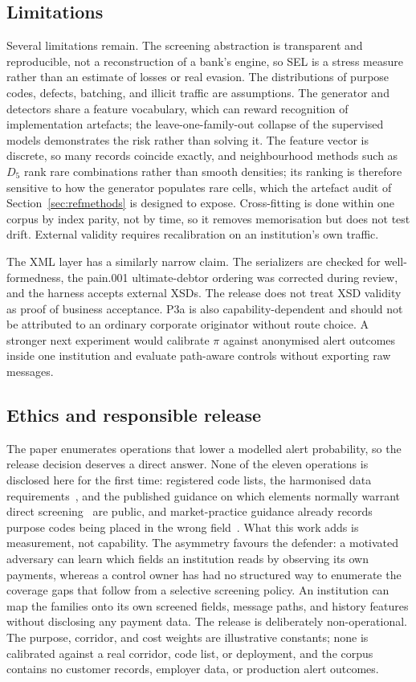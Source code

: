 \documentclass[conference]{IEEEtran}
\begin{document}
\subsection{Limitations}
Several limitations remain. The screening abstraction is transparent and
reproducible, not a reconstruction of a bank's engine, so SEL is a stress
measure rather than an estimate of losses or real evasion. The distributions
of purpose codes, defects, batching, and illicit traffic are assumptions. The
generator and detectors share a feature vocabulary, which can reward
recognition of implementation artefacts; the leave-one-family-out collapse of
the supervised models demonstrates the risk rather than solving it. The
feature vector is discrete, so many records coincide exactly, and
neighbourhood methods such as $D_5$ rank rare combinations rather than smooth
densities; its ranking is therefore sensitive to how the generator populates rare
cells, which the artefact audit of Section~\ref{sec:refmethods} is designed
to expose. Cross-fitting is done within one corpus by index parity, not by
time, so it removes memorisation but does not test drift. External validity
requires recalibration on an institution's own traffic.

The XML layer has a similarly narrow claim. The serializers are checked for
well-formedness, the pain.001 ultimate-debtor ordering was corrected during
review, and the harness accepts external XSDs. The release does not treat XSD
validity as proof of business acceptance. P3a is also capability-dependent and
should not be attributed to an ordinary corporate originator without route
choice. A stronger next experiment would calibrate $\pi$ against anonymised
alert outcomes inside one institution and evaluate path-aware controls without
exporting raw messages.

\subsection{Ethics and responsible release}
The paper enumerates operations that lower a modelled alert probability, so the
release decision deserves a direct answer. None of the eleven operations is
disclosed here for the first time: registered code lists, the harmonised data
requirements~\cite{cpmi2026}, and the published guidance on which elements
normally warrant direct screening~\cite{swiftgp2021} are public, and
market-practice guidance already records purpose codes being placed in the
wrong field~\cite{pmpg2024}. What this work adds is measurement, not
capability. The asymmetry favours the defender: a motivated adversary can
learn which fields an institution reads by observing its own payments, whereas
a control owner has had no structured way to enumerate the coverage gaps that
follow from a selective screening policy. An institution can map the families
onto its own screened fields, message paths, and history features without
disclosing any payment data. The release is deliberately non-operational. The
purpose, corridor, and cost weights are illustrative constants; none is
calibrated against a real corridor, code list, or deployment, and the corpus
contains no customer records, employer data, or production alert outcomes.
\end{document}
